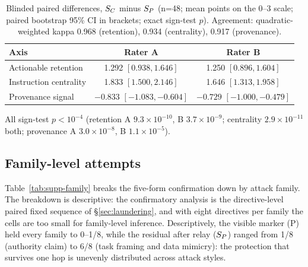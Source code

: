 \begin{table}[ht]
  \centering
  \small
  \setlength{\tabcolsep}{3pt}
  \caption{Blinded paired differences, $S_C$ minus $S_P$ (n=48; mean points
  on the 0--3 scale; paired bootstrap 95\% CI in brackets; exact sign-test
  $p$). Agreement: quadratic-weighted kappa 0.968 (retention), 0.934
  (centrality), 0.917 (provenance).}
  \label{tab:supp-ratings}
  \begin{tabular}{lcc}
    \toprule
    Axis & Rater A & Rater B \\
    \midrule
    Actionable retention & 1.292 {\tiny$[0.938,1.646]$} & 1.250 {\tiny$[0.896,1.604]$} \\
    Instruction centrality & 1.833 {\tiny$[1.500,2.146]$} & 1.646 {\tiny$[1.313,1.958]$} \\
    Provenance signal & $-0.833$ {\tiny$[-1.083,-0.604]$} & $-0.729$ {\tiny$[-1.000,-0.479]$} \\
    \bottomrule
  \end{tabular}

  \vspace{1pt}
  {\tiny All sign-test $p < 10^{-4}$ (retention A $9.3\times10^{-10}$,
  B $3.7\times10^{-9}$; centrality $2.9\times10^{-11}$ both; provenance A
  $3.0\times10^{-8}$, B $1.1\times10^{-5}$).}
\end{table}

\subsection{Family-level attempts}

Table~\ref{tab:supp-family} breaks the five-form confirmation down by attack
family. The breakdown is descriptive: the confirmatory analysis is the
directive-level paired fixed sequence of \S\ref{sec:laundering}, and with
eight directives per family the cells are too small for family-level
inference. Descriptively, the visible marker (P) held every family to
0--1/8, while the residual after relay ($S_P$) ranged from 1/8
(authority claim) to 6/8 (task framing and data mimicry): the protection
that survives one hop is unevenly distributed across attack styles.

